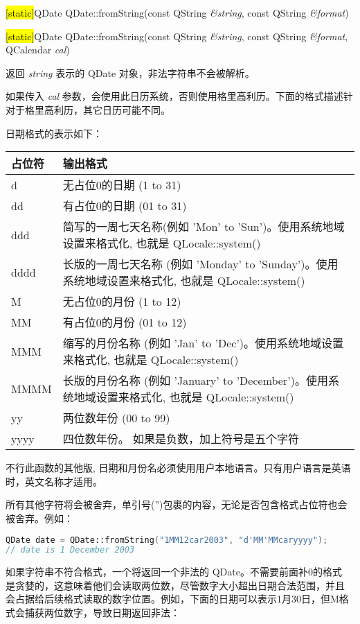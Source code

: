 \hl{[static]}QDate QDate::fromString(const QString \emph{\&string}, const QString \emph{\&format})

\hl{[static]}QDate QDate::fromString(const QString \emph{\&string}, const QString \emph{\&format}, QCalendar \emph{cal})

返回 \emph{string}  表示的 QDate 对象，非法字符串不会被解析。

如果传入 \emph{cal} 参数，会使用此日历系统，否则使用格里高利历。下面的格式描述针对于格里高利历，其它日历可能不同。

日期格式的表示如下：

\begin{tabular}{|l|l|}
\hline
占位符&	输出格式\\
\hline
d&	无占位0的日期 (1 to 31)\\
\hline
dd&	有占位0的日期 (01 to 31)\\
\hline
ddd&	简写的一周七天名称(例如 'Mon' to 'Sun')。使用系统地域设置来格式化, 也就是 QLocale::system()\\
\hline
dddd&	长版的一周七天名称 (例如 'Monday' to 'Sunday')。使用系统地域设置来格式化, 也就是 QLocale::system()\\
\hline
M&	无占位0的月份 (1 to 12)\\
\hline
MM&	有占位0的月份 (01 to 12)\\
\hline
MMM&	缩写的月份名称 (例如 'Jan' to 'Dec')。使用系统地域设置来格式化, 也就是 QLocale::system()\\
\hline
MMMM&	长版的月份名称 (例如 'January' to 'December')。使用系统地域设置来格式化, 也就是 QLocale::system()\\
\hline
yy&	两位数年份 (00 to 99)\\
\hline
yyyy&	四位数年份。 如果是负数，加上符号是五个字符\\
\hline
\end{tabular}

\begin{notice}
 不行此函数的其他版, 日期和月份名必须使用用户本地语言。只有用户语言是英语时，英文名称才适用。
\end{notice}

所有其他字符将会被舍弃，单引号('')包裹的内容，无论是否包含格式占位符也会被舍弃。例如：

\begin{lstlisting}[language=C++]
QDate date = QDate::fromString("1MM12car2003", "d'MM'MMcaryyyy");
// date is 1 December 2003
\end{lstlisting}

如果字符串不符合格式，一个将返回一个非法的 QDate。不需要前面补0的格式
是贪婪的，这意味着他们会读取两位数，尽管数字大小超出日期合法范围，并且
会占据给后续格式读取的数字位置。例如，下面的日期可以表示1月30日，但M格
式会捕获两位数字，导致日期返回非法：

